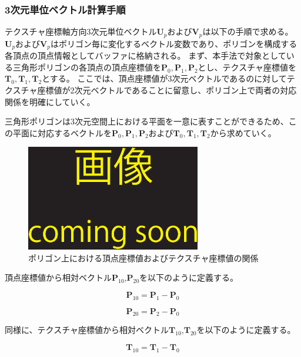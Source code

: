 \subsubsection*{3次元単位ベクトル計算手順}

テクスチャ座標軸方向3次元単位ベクトル$\bm{U}_p$および$\bm{V}_p$は以下の手順で求める。
$\bm{U}_p$および$\bm{V}_p$はポリゴン毎に変化するベクトル変数であり、ポリゴンを構成する各頂点の頂点情報としてバッファに格納される。
まず、本手法で対象としている三角形ポリゴンの各頂点の頂点座標値を$\bm{P}_0,\bm{P}_1,\bm{P}_2$とし、テクスチャ座標値を$\bm{T}_0,\bm{T}_1,\bm{T}_2$とする。
ここでは、頂点座標値が3次元ベクトルであるのに対してテクスチャ座標値が2次元ベクトルであることに留意し、ポリゴン上で両者の対応関係を明確にしていく。

三角形ポリゴンは3次元空間上における平面を一意に表すことができるため、この平面に対応するベクトルを$\bm{P}_0,\bm{P}_1,\bm{P}_2$および$\bm{T}_0,\bm{T}_1,\bm{T}_2$から求めていく。

\begin{figure}[h]
  \centering
  \includegraphics[width=3.0in]{./img/TEMP}
  \caption{ポリゴン上における頂点座標値およびテクスチャ座標値の関係}
  \label{FVertexandtexture}
\end{figure}


頂点座標値から相対ベクトル$\bm{P}_{10}$,$\bm{P}_{20}$を以下のように定義する。

\begin{equation}
\bm{P}_{10} = \bm{P}_1 - \bm{P}_0
\label{EP10}
\end{equation}

\begin{equation}
\bm{P}_{20} = \bm{P}_2 - \bm{P}_0
\label{EP20}
\end{equation}


同様に、テクスチャ座標値から相対ベクトル$\bm{T}_{10}$,$\bm{T}_{20}$を以下のように定義する。

\begin{equation}
\bm{T}_{10} = \bm{T}_1 - \bm{T}_0
\label{ET10}
\end{equation}

